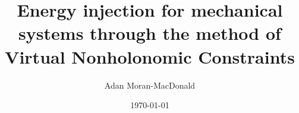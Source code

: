 
\title{Energy injection for mechanical systems through the method of Virtual Nonholonomic Constraints}
\author{Adan Moran-MacDonald }
\date{\today}

\maketitle

